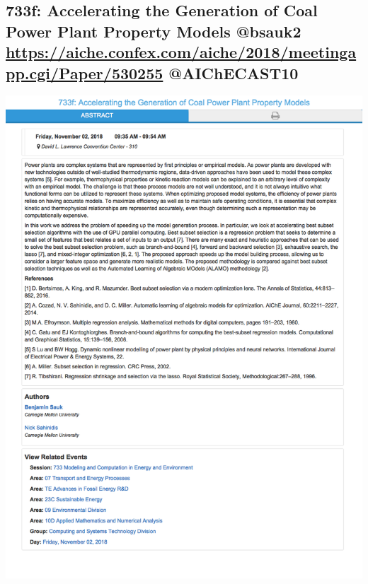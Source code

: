 \documentclass[11pt]{article}
\begin{document}
\subsection{733f: Accelerating the Generation of Coal Power Plant Property Models @bsauk2 \url{https://aiche.confex.com/aiche/2018/meetingapp.cgi/Paper/530255} @AIChECAST10}
\label{sec:org9702a8d}
\begin{center}
\includegraphics[width=.9\linewidth]{./530255.png}
\end{center}
\end{document}

